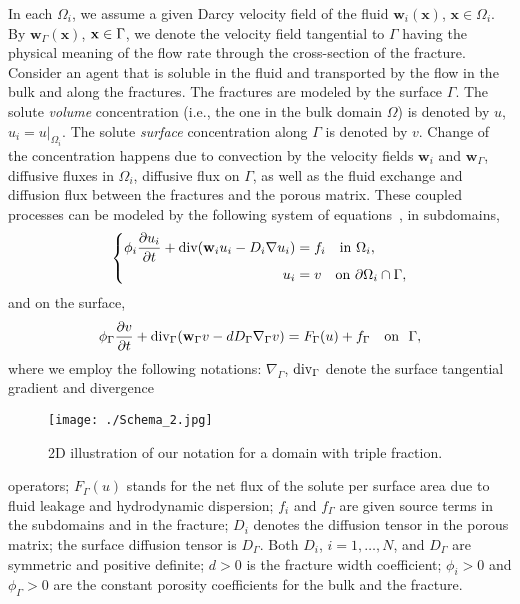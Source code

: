 \documentclass{article}
\newcommand{\rev}[1]{\textcolor{black}{{#1}}}
\newcommand{\bw}{\mathbf w}
\newcommand{\bx}{\mathbf x}
\newcommand{\Div}{\mbox{\rm div}}
\def\dO{{\partial\Omega} }
\begin{document}
In each  $\Omega_i$, we assume a given Darcy velocity field of the fluid $\bw_i(\bx)$, $\bx \in \Omega_i$.
By $\bw_\Gamma(\bx)$, $\bx \in \rev{\Gamma}$, we denote the velocity field tangential to $\Gamma$ having the physical meaning of the flow rate through the cross-section of the fracture.  Consider an agent that is soluble in the fluid and transported by the flow in the bulk and along the fractures. The fractures are modeled by the surface $\Gamma$.
The solute \emph{volume} concentration (i.e., the one in the bulk domain $\Omega$) is denoted by $u$, $u_i=u|_{\Omega_i}$. The solute \emph{surface} concentration along $\Gamma$ is denoted by $v$.
Change of the concentration happens due to convection by the  velocity fields $\bw_i$ and $\bw_\Gamma$, diffusive fluxes in $\Omega_i$, diffusive flux on $\Gamma$, as well as the fluid exchange and diffusion flux between the fractures and the porous matrix.
These coupled processes can be modeled by the following system of equations~\cite{alboin2002modeling}, in subdomains,
\begin{equation} \label{diffeq1}
\left\{
\begin{aligned}
 \phi_i\frac{\partial u_i}{\partial t} + \Div(\bw_i  u_i- D_i \nabla u_i) &= f_i \quad \text{in}~ \Omega_i,\\
 u_i&=v \quad \text{on}~ \dO_i\cap\Gamma,
 \end{aligned}
\right.
 \end{equation}
and on the surface,
\begin{equation} \label{diffeq2}
 \phi_\Gamma\frac{\partial v}{\partial t} + \Div_\Gamma (\bw_\Gamma v - d D_\Gamma \nabla_\Gamma v) =  F_\Gamma(u)+ f_\Gamma  \quad \text{on}~~\Gamma,
 \end{equation}
where we employ the following notations:  $\nabla_\Gamma$,  $\Div_\Gamma$  denote the surface tangential gradient and divergence
 \begin{wrapfigure}{r}{0.4\textwidth}
\vspace{-20pt}
  \begin{center}
    \texttt{[image: ./Schema\_2.jpg]}%
    \caption{2D illustration of our notation for a domain with triple fraction. %
    }
    \label{fig:Schema}
  \end{center}
  \vspace{-20pt}
  \vspace{1pt}
\end{wrapfigure}
operators; $F_\Gamma(u)$ stands for the  net flux of the solute per surface area due to fluid leakage and hydrodynamic dispersion;   $f_i$ and $f_\Gamma$ are given source terms in the subdomains and in the fracture;  $D_i$ denotes the diffusion tensor in the porous matrix; the surface diffusion tensor is $D_\Gamma$.
Both $D_i$, $i=1,\dots,N$, and $D_\Gamma$ are symmetric and positive definite; $d>0$ is the fracture width coefficient; $\phi_i>0$ and $\phi_\Gamma>0$ are the constant porosity coefficients for the bulk and the fracture.
\end{document}

